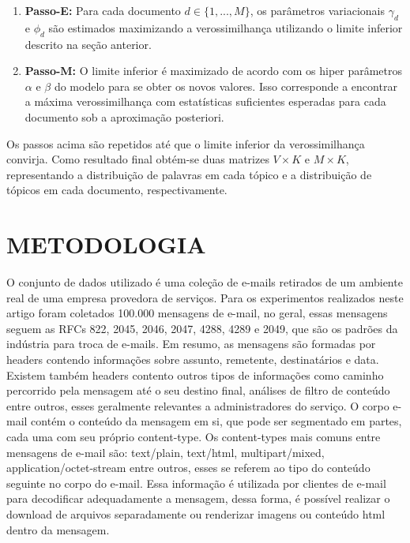 \documentclass[12pt,a4paper]{article}
\begin{document}
  \begin{enumerate}
  \item \textbf{Passo-E:} Para cada documento $d \in \{1,. . . , M\}$, os parâmetros variacionais $\gamma_d$ e $\phi_d$ são estimados maximizando a verossimilhança utilizando o limite inferior descrito na seção anterior.
  \item \textbf{Passo-M:} O limite inferior é maximizado  de acordo com os hiper parâmetros $\alpha$ e $\beta$ do modelo para se obter os novos valores. 
   Isso corresponde a encontrar a máxima verossimilhança com estatísticas suficientes esperadas para cada documento sob a aproximação posteriori.
  \end{enumerate}
  
  Os passos acima são repetidos até que o limite inferior da verossimilhança convirja. Como resultado final obtém-se duas matrizes $V \times K$ e $M \times K$,
   representando  a distribuição de palavras em cada tópico e a distribuição de tópicos em cada documento, respectivamente.
  
  
  
  \section{METODOLOGIA}
  O conjunto de dados utilizado é uma coleção de e-mails retirados de um ambiente real de uma empresa provedora de serviços. 
   Para os experimentos realizados neste artigo foram coletados 100.000 mensagens de e-mail, no geral, essas mensagens seguem as RFCs 822, 2045, 2046, 2047, 4288, 4289 e 2049,
   que são os padrões da indústria para troca de e-mails.	Em resumo, as mensagens são formadas por headers contendo informações sobre assunto, remetente, destinatários e data.
   Existem também headers contento outros tipos de informações como caminho percorrido pela mensagem até o seu destino final, análises de filtro de conteúdo entre outros,
   esses geralmente relevantes a administradores do serviço. O corpo e-mail contém o conteúdo da mensagem em si, que pode ser segmentado em  partes, cada uma com seu próprio content-type. 
   Os content-types mais comuns entre mensagens de e-mail são: text/plain, text/html, multipart/mixed, application/octet-stream entre outros, esses se referem ao tipo do conteúdo seguinte no corpo do e-mail.
   Essa informação é utilizada por clientes de e-mail para decodificar adequadamente a mensagem,
   dessa forma, é possível realizar o download de arquivos separadamente ou renderizar imagens ou conteúdo html dentro da mensagem.
  
\end{document}

